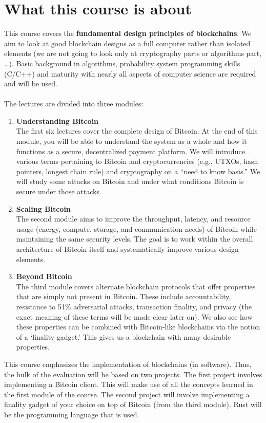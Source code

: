 \documentclass{report}
\begin{document}
\section{What this course is about}
This course covers the \textbf{fundamental design principles of blockchains}. We aim to look at good blockchain designs as a full computer rather than isolated elements (we are not going to look only at cryptography parts or algorithms part, …).
Basic background in algorithms, probability system programming skills (C/C++) and maturity with nearly all aspects of computer science are required and will be used.\\\\
The lectures are divided into three modules:
\begin{enumerate}
	\item \textbf{Understanding Bitcoin}\\
	The first six lectures cover the complete design of Bitcoin. At the end of this module, you will be able to understand the system as a whole and how it functions as a	secure, decentralized payment platform. We will introduce various terms pertaining to Bitcoin and cryptocurrencies (e.g., UTXOs, hash pointers, longest chain rule) and cryptography on a “need to	know basis.” We will study some attacks on Bitcoin and under what conditions Bitcoin is secure under those attacks.
	\item \textbf{Scaling Bitcoin}\\
	The second module aims to improve the throughput, latency, and resource usage
	(energy, compute, storage, and communication needs) of Bitcoin while maintaining the same security
	levels. The goal is to work within the overall architecture of Bitcoin itself and systematically improve
	various design elements.
	\item \textbf{Beyond Bitcoin}\\
	The third module covers alternate blockchain protocols that offer properties
	that are simply not present in Bitcoin. These include accountability, resistance to 51\% adversarial
	attacks, transaction finality, and privacy (the exact meaning of these terms will be made clear later
	on). We also see how these properties can be combined with Bitcoin-like blockchains via the notion
	of a ‘finality gadget.’ This gives us a blockchain with many desirable properties.
\end{enumerate}
This course emphasizes the implementation of blockchains (in software).
Thus, the bulk of the evaluation will be based on two projects. The first project involves implementing
a Bitcoin client. This will make use of all the concepts learned in the first module of the course.
The second project will involve implementing a finality gadget of your choice on top of Bitcoin (from
the third module). Rust will be the programming language that is used.
\end{document}
